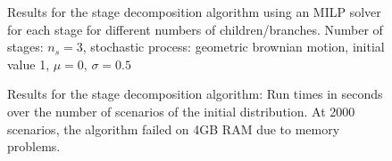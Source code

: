 \begin{figure}
  \centering
  \caption{Results for the stage decomposition algorithm using an MILP solver for each stage for different numbers of children/branches. Number of stages: $n_s=3$, stochastic process: geometric brownian motion, initial value 1, $\mu=0,\,\sigma=0.5$}
  \label{fig:naive-milp-results-errors}
\end{figure}
\begin{figure}
  \centering
  \caption{Results for the stage decomposition algorithm: Run times in seconds over the number of scenarios of the initial distribution. At 2000 scenarios, the algorithm failed on 4GB RAM due to memory problems.}
  \label{fig:naive-milp-results-timing}
\end{figure}
